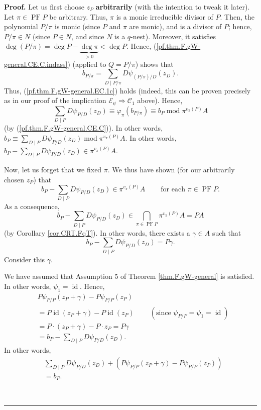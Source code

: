 \documentclass[numbers=enddot,12pt,final,onecolumn,notitlepage]{scrartcl}%
\theoremstyle{definition}
\newenvironment{proof}[1][Proof]{\noindent\textbf{#1.} }{\ \rule{0.5em}{0.5em}}
\let\sumnonlimits\sum
\renewcommand{\sum}{\sumnonlimits\limits}
\begin{document}
\begin{proof}
Let us first choose $z_{P}$ \textbf{arbitrarily} (with the intention to tweak
it later). Let $\pi\in\operatorname*{PF}P$ be arbitrary. Thus, $\pi$ is a
monic irreducible divisor of $P$. Then, the polynomial $P/\pi$ is monic (since
$P$ and $\pi$ are monic), and is a divisor of $P$; hence, $P/\pi\in N$ (since
$P\in N$, and since $N$ is a $q$-nest). Moreover, it satisfies $\deg\left(
P/\pi\right)  =\deg P-\underbrace{\deg\pi}_{>0}<\deg P$. Hence,
(\ref{pf.thm.F.gW-general.CE.C.indass}) (applied to $Q=P/\pi$) shows that%
\[
b_{P/\pi}=\sum_{D\mid P/\pi}D\psi_{\left(  P/\pi\right)  /D}\left(
z_{D}\right)  .
\]
Thus, (\ref{pf.thm.F.gW-general.EC.1c}) holds (indeed, this can be proven
precisely as in our proof of the implication $\mathcal{E}_{\psi}%
\Longrightarrow\mathcal{C}_{1}$ above). Hence,%
\[
\sum_{D\mid P}D\psi_{P/D}\left(  z_{D}\right)  \equiv\varphi_{\pi}\left(
b_{P/\pi}\right)  \equiv b_{P}\operatorname{mod}\pi^{v_{\pi}\left(  P\right)
}A
\]
(by (\ref{pf.thm.F.gW-general.CE.C})). In other words, $b_{P}\equiv\sum_{D\mid
P}D\psi_{P/D}\left(  z_{D}\right)  \operatorname{mod}\pi^{v_{\pi}\left(
P\right)  }A$. In other words, $b_{P}-\sum_{D\mid P}D\psi_{P/D}\left(
z_{D}\right)  \in\pi^{v_{\pi}\left(  P\right)  }A$.

Now, let us forget that we fixed $\pi$. We thus have shown (for our
arbitrarily chosen $z_{P}$) that%
\[
b_{P}-\sum_{D\mid P}D\psi_{P/D}\left(  z_{D}\right)  \in\pi^{v_{\pi}\left(
P\right)  }A\ \ \ \ \ \ \ \ \ \ \text{for each }\pi\in\operatorname*{PF}P.
\]
As a consequence,%
\[
b_{P}-\sum_{D\mid P}D\psi_{P/D}\left(  z_{D}\right)  \in\bigcap_{\pi
\in\operatorname*{PF}P}\pi^{v_{\pi}\left(  P\right)  }A=PA
\]
(by Corollary \ref{cor.CRT.FqT}). In other words, there exists a $\gamma\in A$
such that
\[
b_{P}-\sum_{D\mid P}D\psi_{P/D}\left(  z_{D}\right)  =P\gamma.
\]
Consider this $\gamma$.

We have assumed that Assumption 5 of Theorem \ref{thm.F.gW-general} is
satisfied. In other words, $\psi_{1}=\operatorname*{id}$. Hence,%
\begin{align*}
&  P\psi_{P/P}\left(  z_{P}+\gamma\right)  -P\psi_{P/P}\left(  z_{P}\right) \\
&  =P\operatorname*{id}\left(  z_{P}+\gamma\right)  -P\operatorname*{id}%
\left(  z_{P}\right)  \ \ \ \ \ \ \ \ \ \ \left(  \text{since }\psi_{P/P}%
=\psi_{1}=\operatorname*{id}\right) \\
&  =P\cdot\left(  z_{P}+\gamma\right)  -P\cdot z_{P}=P\gamma\\
&  =b_{P}-\sum_{D\mid P}D\psi_{P/D}\left(  z_{D}\right)  .
\end{align*}
In other words,%
\begin{align}
&  \sum_{D\mid P}D\psi_{P/D}\left(  z_{D}\right)  +\left(  P\psi_{P/P}\left(
z_{P}+\gamma\right)  -P\psi_{P/P}\left(  z_{P}\right)  \right) \nonumber\\
&  =b_{P}. \label{pf.thm.F.gW-general.CE.C.sum-upd}%
\end{align}



\end{proof}
\end{document}

